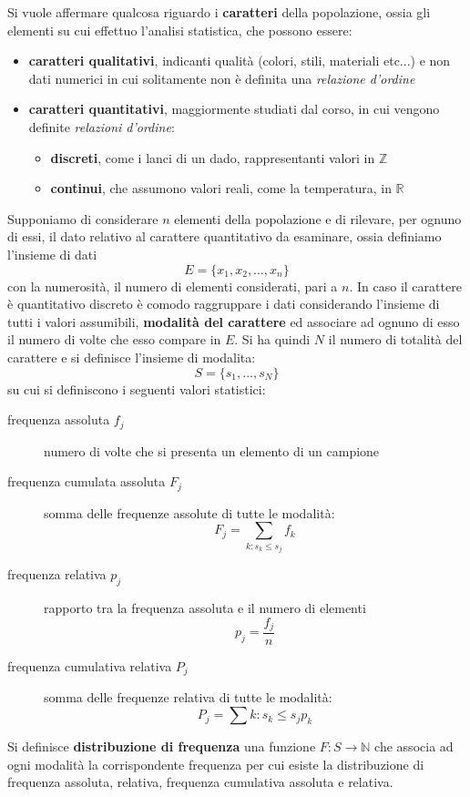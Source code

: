 \documentclass[a4paper,12pt, oneside]{book}
\newcommand{\numberset}{\mathbb}
\newcommand{\N}{\numberset{N}}
\newcommand{\Z}{\numberset{Z}}
\newcommand{\R}{\numberset{R}}
\begin{document}
Si vuole affermare qualcosa riguardo i \textbf{caratteri} della popolazione, ossia gli elementi su cui effettuo 
l'analisi statistica, che possono essere:
\begin{itemize}
    \item \textbf{caratteri qualitativi}, indicanti qualità (colori, stili, materiali etc...) e non dati numerici
             in cui solitamente non è definita una \textit{relazione d'ordine}
    \item \textbf{caratteri quantitativi}, maggiormente studiati dal corso, in cui vengono definite \emph{relazioni d'ordine}:
        \begin{itemize}
            \item \textbf{discreti}, come i lanci di un dado, rappresentanti valori in $\Z$
            \item \textbf{continui}, che assumono valori reali, come la temperatura, in $\R$
        \end{itemize}
\end{itemize}
Supponiamo di considerare $n$ elementi della popolazione e di rilevare, per ognuno di essi,
il dato relativo al carattere quantitativo da esaminare, ossia definiamo l'insieme di dati
\[ E=\{x_1, x_2, \dots, x_n\} \]
con la numerosità, il numero di elementi considerati, pari a $n$. 
In caso il carattere è quantitativo discreto è comodo raggruppare i dati considerando 
l'insieme di tutti i valori assumibili, \textbf{modalità del carattere} ed associare ad ognuno 
di esso il numero di volte che esso compare in $E$.\newline
Si ha quindi $N$ il numero di totalità del carattere e si definisce l'insieme di modalita:
\[ S=\{s_1,...,s_N\} \]
su cui si definiscono i seguenti valori statistici:
\begin{description}
    \item [frequenza assoluta $f_j$] numero di volte che si presenta un elemento di un campione
    \item [frequenza cumulata assoluta $F_j$] somma delle frequenze assolute di tutte le modalità:
            \[ F_j = \sum_{k:s_k \leq s_j} f_k \]
    \item [frequenza relativa $p_j$] rapporto tra la frequenza assoluta e il numero di elementi 
            \[ p_j = \frac{f_j}{n} \]
    \item [frequenza cumulativa relativa $P_j$] somma delle frequenze relativa di tutte le modalità:
            \[ P_j = \sum{k:s_k \leq s_j} p_k \]
\end{description}
Si definisce \textbf{distribuzione di frequenza} una funzione $F:S \to \N$ che associa ad ogni modalità la corrispondente frequenza
per cui esiste la distribuzione di frequenza assoluta, relativa, frequenza cumulativa assoluta e relativa.
\end{document}
